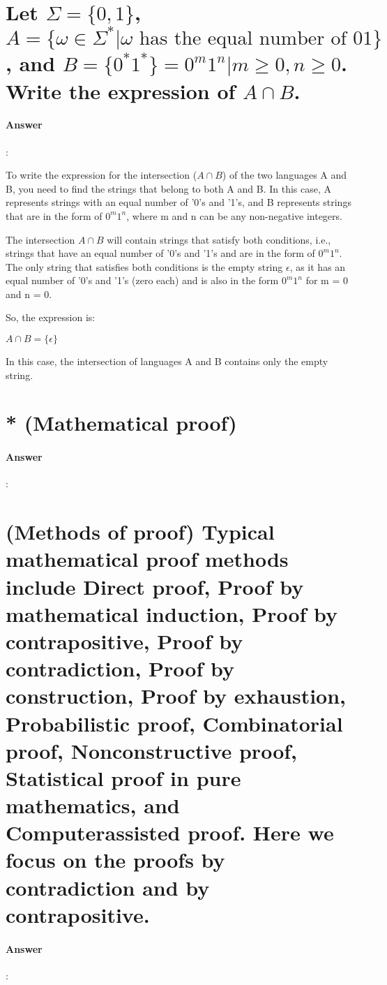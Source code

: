 \documentclass{article}
\begin{document}
\section{Let $\Sigma = \{0, 1\}$, $A = \{\omega \in \Sigma ^* | \omega \text{ has the equal number of 01}\}$, and $B = \{0^*1^*\} = {0^m1^n | m \geq 0, n \geq 0}$. Write the expression of $A \cap  B$.}

\paragraph{Answer}:

To write the expression for the intersection ($A \cap B$) of the two languages A and B, you need to find the strings that belong to both A and B. In this case, A represents strings with an equal number of '0's and '1's, and B represents strings that are in the form of $0^m1^n$, where m and n can be any non-negative integers.

The intersection $A \cap B$ will contain strings that satisfy both conditions, i.e., strings that have an equal number of '0's and '1's and are in the form of $0^m1^n$. The only string that satisfies both conditions is the empty string $\epsilon$, as it has an equal number of '0's and '1's (zero each) and is also in the form $0^m1^n$ for m = 0 and n = 0.

So, the expression is:

$A \cap  B = \{\epsilon\}$

In this case, the intersection of languages A and B contains only the empty string.

\section{* (Mathematical proof)}

\paragraph{Answer}:

\section{(Methods of proof) Typical mathematical proof methods include Direct proof, Proof by mathematical induction, Proof by contrapositive, Proof by contradiction, Proof by construction, Proof by exhaustion, Probabilistic proof, Combinatorial proof, Nonconstructive proof, Statistical proof in pure mathematics, and Computerassisted proof. Here we focus on the proofs by contradiction and by contrapositive.}

\paragraph{Answer}:
\end{document}
